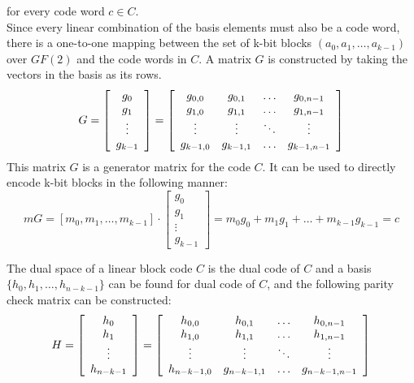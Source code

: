 for every code word $c \in C$.\\
Since every linear combination of the basis elements must also be a code word, there is a one-to-one mapping between the set of k-bit blocks $(a_0, a_1, \ldots , a_{k-1})$ over $GF(2)$ and the code words in $C$. A matrix $G$ is constructed by taking the vectors in the basis as its rows.
\[ G = \left[ \begin{array}{c}
    g_0 \\
    g_1 \\
    \vdots \\
    g_{k-1}
\end{array} \right] = \left[ \begin{array}{c c c c}
    g_{0,0} & g_{0,1} & \ldots & g_{0,n-1} \\
    g_{1,0} & g_{1,1} & \ldots & g_{1,n-1} \\
    \vdots & \vdots & \ddots & \vdots \\
    g_{k-1,0} & g_{k-1,1} & \ldots & g_{k-1,n-1}
\end{array} \right]
\]
This matrix $G$ is a generator matrix for the code $C$. It can be used to directly encode k-bit blocks in the following manner:
\[
mG = [m_0, m_1, \ldots, m_{k-1}] \cdot \left[ \begin{array}{c}
    g_0 \\
    g_1 \\
    \vdots \\
    g_{k-1}
\end{array} \right] = m_0g_0 + m_1g_1 + \ldots + m_{k-1}g_{k-1} = c
\]

The dual space of a linear block code $C$ is the dual code of $C$ and a basis $\{h_0, h_1, \ldots , h_{n-k-1}\}$ can be found for dual code of $C$, and the following parity check matrix can be constructed:
\[
H = \left[ \begin{array}{c}
    h_0 \\
    h_1 \\
    \vdots \\
    h_{n-k-1}
\end{array} \right] = \left[ \begin{array}{c c c c}
    h_{0,0} & h_{0,1} & \ldots & h_{0,n-1} \\
    h_{1,0} & h_{1,1} & \ldots & h_{1,n-1} \\
    \vdots & \vdots & \ddots & \vdots \\
    h_{n-k-1,0} & g_{n-k-1,1} & \ldots & g_{n-k-1,n-1}
\end{array} \right]
\]


